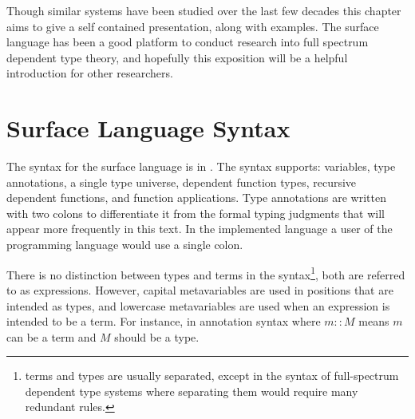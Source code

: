 Though similar systems have been studied over the last few decades this chapter aims to give a self contained presentation, along with examples.
The surface language has been a good platform to conduct research into full spectrum dependent type theory, and hopefully this exposition will be a helpful introduction for other researchers.

\section{Surface Language Syntax}

The syntax for the surface language is in .
The syntax supports: variables, type annotations, a single type universe, dependent function types, recursive dependent functions, and function applications.
Type annotations are written with two colons to differentiate it from the formal typing judgments that will appear more frequently in this text.
In the implemented language a user of the programming language would use a single colon.

There is no distinction between types and terms in the syntax\footnote{
  terms and types are usually separated, except in the syntax of full-spectrum dependent type systems where separating them would require many redundant rules.
  }, both are referred to as expressions.
However, capital metavariables are used in positions that are intended as types, and lowercase metavariables are used when an expression is intended to be a term.
For instance, in annotation syntax where $m::M$ means $m$ can be a term and $M$ should be a type.


